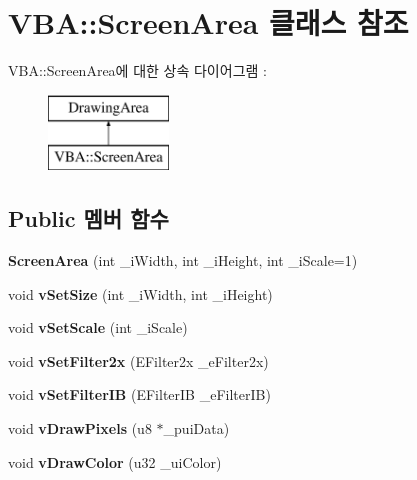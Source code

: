 \hypertarget{class_v_b_a_1_1_screen_area}{}\section{V\+BA\+:\+:Screen\+Area 클래스 참조}
\label{class_v_b_a_1_1_screen_area}
V\+BA\+:\+:Screen\+Area에 대한 상속 다이어그램 \+: \begin{figure}[H]
\begin{center}
\leavevmode
\includegraphics[height=2.000000cm]{class_v_b_a_1_1_screen_area}
\end{center}
\end{figure}
\subsection*{Public 멤버 함수}
\begin{DoxyCompactItemize}
\item 
\mbox{\label{class_v_b_a_1_1_screen_area_a5bc7bd5f6077d82a7affa8527d3112c9}} 
{\bfseries Screen\+Area} (int \+\_\+i\+Width, int \+\_\+i\+Height, int \+\_\+i\+Scale=1)
\item 
\mbox{\label{class_v_b_a_1_1_screen_area_a67e85578c2affd30bfe40b8768900d83}} 
void {\bfseries v\+Set\+Size} (int \+\_\+i\+Width, int \+\_\+i\+Height)
\item 
\mbox{\label{class_v_b_a_1_1_screen_area_a39182c21dfcc5c1f58171986f9c6305f}} 
void {\bfseries v\+Set\+Scale} (int \+\_\+i\+Scale)
\item 
\mbox{\label{class_v_b_a_1_1_screen_area_ad42090409e7ddec2c1cd9d715a38f8d9}} 
void {\bfseries v\+Set\+Filter2x} (E\+Filter2x \+\_\+e\+Filter2x)
\item 
\mbox{\label{class_v_b_a_1_1_screen_area_a7a23a673843050e232e83588cfab81ce}} 
void {\bfseries v\+Set\+Filter\+IB} (E\+Filter\+IB \+\_\+e\+Filter\+IB)
\item 
\mbox{\label{class_v_b_a_1_1_screen_area_ad7b6579afb665abf3b6a5004f03b63f8}} 
void {\bfseries v\+Draw\+Pixels} (u8 $\ast$\+\_\+pui\+Data)
\item 
\mbox{\label{class_v_b_a_1_1_screen_area_aaefba8f2cfd6d3c759df0b38f9edd1bd}} 
void {\bfseries v\+Draw\+Color} (u32 \+\_\+ui\+Color)
\end{DoxyCompactItemize}

